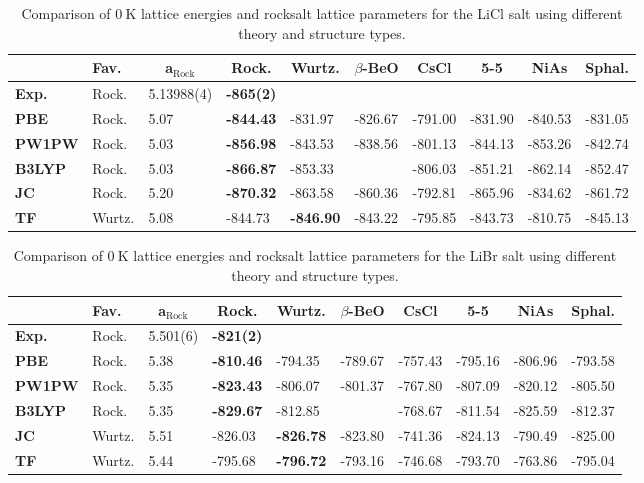 \documentclass[titlepage,11pt]{article}
\begin{document}
\begin{table}[]
	\begin{tabular}{l|lllllllll}
		& \textbf{Fav.} & \multicolumn{1}{c}{\textbf{a$_{\text{Rock}}$}} & \multicolumn{1}{c}{\textbf{Rock.}} & \multicolumn{1}{c}{\textbf{Wurtz.}} & \multicolumn{1}{c}{\textbf{$\beta$-BeO}} & \multicolumn{1}{c}{\textbf{CsCl}} & \multicolumn{1}{c}{\textbf{5-5}} & \multicolumn{1}{c}{\textbf{NiAs}} & \multicolumn{1}{c}{\textbf{Sphal.}} \\ \hline
		\textbf{Exp.} & Rock. & 5.13988(4) & \textbf{-865(2)} & &  &  &  &  &  \\
		\textbf{PBE} & Rock. & 5.07 & \textbf{-844.43} & -831.97 & -826.67 & -791.00 & -831.90 & -840.53 & -831.05\\
		\textbf{PW1PW} & Rock. & 5.03 & \textbf{-856.98} & -843.53 & -838.56 & -801.13 & -844.13 & -853.26 & -842.74\\
		\textbf{B3LYP} & Rock. & 5.03 & \textbf{-866.87} & -853.33 &  & -806.03 & -851.21 & -862.14 & -852.47\\
		\textbf{JC} & Rock. & 5.20 & \textbf{-870.32} & -863.58 & -860.36 & -792.81 & -865.96 & -834.62 & -861.72 \\
		\textbf{TF} & Wurtz. & 5.08 & -844.73 & \textbf{-846.90} & -843.22 & -795.85 & -843.73 & -810.75 & -845.13 	
	\end{tabular}
	\caption{\label{tab:LiCl} Comparison of $\SI{0}{\kelvin}$ lattice energies and rocksalt lattice parameters for the LiCl salt using different theory and structure types.}
\end{table}
\begin{table}[]
	\begin{tabular}{l|lllllllll}
		& \textbf{Fav.} & \multicolumn{1}{c}{\textbf{a$_{\text{Rock}}$}} & \multicolumn{1}{c}{\textbf{Rock.}} & \multicolumn{1}{c}{\textbf{Wurtz.}} & \multicolumn{1}{c}{\textbf{$\beta$-BeO}} & \multicolumn{1}{c}{\textbf{CsCl}} & \multicolumn{1}{c}{\textbf{5-5}} & \multicolumn{1}{c}{\textbf{NiAs}} & \multicolumn{1}{c}{\textbf{Sphal.}} \\ \hline
		\textbf{Exp.} & Rock. & 5.501(6) & \textbf{-821(2)} &  &  &  &  &  &  \\
		\textbf{PBE} & Rock. & 5.38 & \textbf{-810.46} & -794.35 & -789.67 & -757.43 & -795.16 & -806.96 & -793.58\\
		\textbf{PW1PW} & Rock. & 5.35 & \textbf{-823.43} & -806.07 & -801.37 & -767.80 & -807.09 & -820.12 & -805.50\\
		\textbf{B3LYP} & Rock. & 5.35 & \textbf{-829.67} & -812.85 &   & -768.67 & -811.54 & -825.59 & -812.37\\
		\textbf{JC} & Wurtz. & 5.51 & -826.03 & \textbf{-826.78} & -823.80 & -741.36 & -824.13 & -790.49 & -825.00 \\
		\textbf{TF} & Wurtz. & 5.44 & -795.68 & \textbf{-796.72} & -793.16 & -746.68 & -793.70 & -763.86 & -795.04 	
	\end{tabular}
	\caption{\label{tab:LiBr} Comparison of $\SI{0}{\kelvin}$ lattice energies and rocksalt lattice parameters for the LiBr salt using different theory and structure types.}
\end{table}
\end{document}
